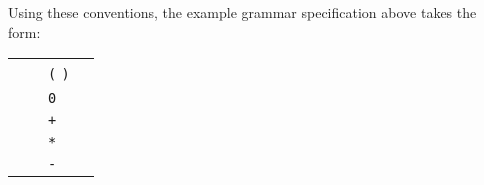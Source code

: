 \begin{isabellebody}
\begin{isamarkuptext}
  Using these conventions, the example grammar specification above
  takes the form:
  \begin{center}
  \begin{tabular}{rclc}
    \isa{A} & \isa{{\isaliteral{22}{\isachardoublequote}}{\isaliteral{3D}{\isacharequal}}{\isaliteral{22}{\isachardoublequote}}} & \verb|(| \isa{A} \verb|)| \\
              & \isa{{\isaliteral{22}{\isachardoublequote}}{\isaliteral{7C}{\isacharbar}}{\isaliteral{22}{\isachardoublequote}}} & \verb|0| & \qquad\qquad \\
              & \isa{{\isaliteral{22}{\isachardoublequote}}{\isaliteral{7C}{\isacharbar}}{\isaliteral{22}{\isachardoublequote}}} & \isa{A} \verb|+| \isa{{\isaliteral{22}{\isachardoublequote}}A\isaliteral{5C3C5E7375703E}{}\isactrlsup {\isaliteral{28}{\isacharparenleft}}\isaliteral{5C3C5E7375703E}{}\isactrlsup {\isadigit{1}}\isaliteral{5C3C5E7375703E}{}\isactrlsup {\isaliteral{29}{\isacharparenright}}{\isaliteral{22}{\isachardoublequote}}} & \isa{{\isaliteral{22}{\isachardoublequote}}{\isaliteral{28}{\isacharparenleft}}{\isadigit{0}}{\isaliteral{29}{\isacharparenright}}{\isaliteral{22}{\isachardoublequote}}} \\
              & \isa{{\isaliteral{22}{\isachardoublequote}}{\isaliteral{7C}{\isacharbar}}{\isaliteral{22}{\isachardoublequote}}} & \isa{{\isaliteral{22}{\isachardoublequote}}A\isaliteral{5C3C5E7375703E}{}\isactrlsup {\isaliteral{28}{\isacharparenleft}}\isaliteral{5C3C5E7375703E}{}\isactrlsup {\isadigit{3}}\isaliteral{5C3C5E7375703E}{}\isactrlsup {\isaliteral{29}{\isacharparenright}}{\isaliteral{22}{\isachardoublequote}}} \verb|*| \isa{{\isaliteral{22}{\isachardoublequote}}A\isaliteral{5C3C5E7375703E}{}\isactrlsup {\isaliteral{28}{\isacharparenleft}}\isaliteral{5C3C5E7375703E}{}\isactrlsup {\isadigit{2}}\isaliteral{5C3C5E7375703E}{}\isactrlsup {\isaliteral{29}{\isacharparenright}}{\isaliteral{22}{\isachardoublequote}}} & \isa{{\isaliteral{22}{\isachardoublequote}}{\isaliteral{28}{\isacharparenleft}}{\isadigit{2}}{\isaliteral{29}{\isacharparenright}}{\isaliteral{22}{\isachardoublequote}}} \\
              & \isa{{\isaliteral{22}{\isachardoublequote}}{\isaliteral{7C}{\isacharbar}}{\isaliteral{22}{\isachardoublequote}}} & \verb|-| \isa{{\isaliteral{22}{\isachardoublequote}}A\isaliteral{5C3C5E7375703E}{}\isactrlsup {\isaliteral{28}{\isacharparenleft}}\isaliteral{5C3C5E7375703E}{}\isactrlsup {\isadigit{3}}\isaliteral{5C3C5E7375703E}{}\isactrlsup {\isaliteral{29}{\isacharparenright}}{\isaliteral{22}{\isachardoublequote}}} & \isa{{\isaliteral{22}{\isachardoublequote}}{\isaliteral{28}{\isacharparenleft}}{\isadigit{3}}{\isaliteral{29}{\isacharparenright}}{\isaliteral{22}{\isachardoublequote}}} \\

\end{tabular}
\end{center}
\end{isamarkuptext}
\end{isabellebody}
